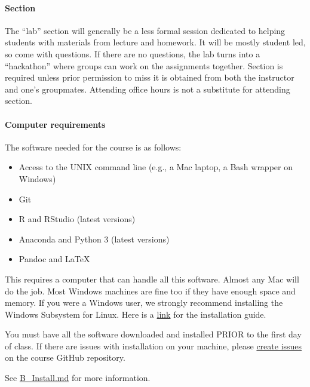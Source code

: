 \documentclass[
]{article}
\providecommand{\tightlist}{%
  \setlength{\itemsep}{0pt}\setlength{\parskip}{0pt}}
\begin{document}
\hypertarget{section}{%
\paragraph{Section}\label{section}}

The ``lab'' section will generally be a less formal session dedicated to
helping students with materials from lecture and homework. It will be
mostly student led, so come with questions. If there are no questions,
the lab turns into a ``hackathon'' where groups can work on the
assignments together. Section is required unless prior permission to
miss it is obtained from both the instructor and one's groupmates.
Attending office hours is not a substitute for attending section.

\hypertarget{computer-requirements}{%
\paragraph{Computer requirements}\label{computer-requirements}}

The software needed for the course is as follows:

\begin{itemize}
\tightlist
\item
  Access to the UNIX command line (e.g., a Mac laptop, a Bash wrapper on
  Windows)
\item
  Git
\item
  R and RStudio (latest versions)
\item
  Anaconda and Python 3 (latest versions)
\item
  Pandoc and LaTeX
\end{itemize}

This requires a computer that can handle all this software. Almost any
Mac will do the job. Most Windows machines are fine too if they have
enough space and memory. If you were a Windows user, we strongly
recommend installing the Windows Subsystem for Linux. Here is a
\href{https://docs.microsoft.com/en-us/windows/wsl/install-win10}{link}
for the installation guide.

You must have all the software downloaded and installed PRIOR to the
first day of class. If there are issues with installation on your
machine, please
\href{https://github.com/PS239T/spring_2021/issues}{create issues} on
the course GitHub repository.

See
\href{https://github.com/jaeyk/PS239T/blob/master/B_Install.md}{B\_Install.md}
for more information.
\end{document}
